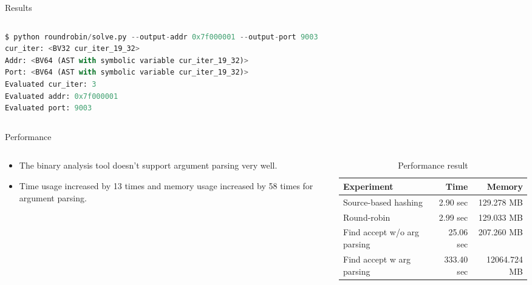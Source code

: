 \documentclass[final,hyperref={pdfpagelabels=false}]{beamer}
\begin{document}
\begin{frame}[t,fragile]
\begin{columns}[t]
\begin{column}{.47\textwidth}
\begin{block}{Results}
\begin{columns}
\begin{column}{.48\textwidth}
\begin{lstlisting}[language=python,basicstyle=\footnotesize\ttfamily]
$ python roundrobin/solve.py --output-addr 0x7f000001 --output-port 9003
cur_iter: <BV32 cur_iter_19_32>
Addr: <BV64 (AST with symbolic variable cur_iter_19_32)>
Port: <BV64 (AST with symbolic variable cur_iter_19_32)>
Evaluated cur_iter: 3
Evaluated addr: 0x7f000001
Evaluated port: 9003
\end{lstlisting}
\end{column}
\begin{column}{.40\textwidth}
\end{column}
\end{columns}

\end{block}


\begin{block}{Performance}

\begin{columns}
\begin{column}{.39\textwidth}
\begin{itemize}
    \item The binary analysis tool doesn't support argument parsing very well.
    \item Time usage increased by 13 times and memory usage increased by 58
        times for argument parsing.
\end{itemize}
\end{column}

\begin{column}{.58\textwidth}
\begin{table}
\begin{tabular}{l r r}
\toprule
\textbf{Experiment} & \textbf{Time} & \textbf{Memory}\\
\midrule
Source-based hashing        & 2.90 sec & 129.278 MB \\
Round-robin                 & 2.99 sec & 129.033 MB \\
Find accept w/o arg parsing & 25.06 sec & 207.260 MB \\
Find accept w arg parsing   & 333.40 sec & 12064.724 MB \\
\bottomrule
\end{tabular}
\caption{Performance result}
\end{table}
\end{column}
\end{columns}


\end{block}
\end{column}
\end{columns}
\end{frame}
\end{document}
